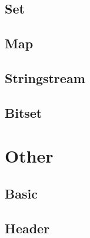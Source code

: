 \subsection{Set}


\subsection{Map}


\subsection{Stringstream}


\subsection{Bitset}






\section{Other}

\subsection{Basic}


\subsection{Header}
